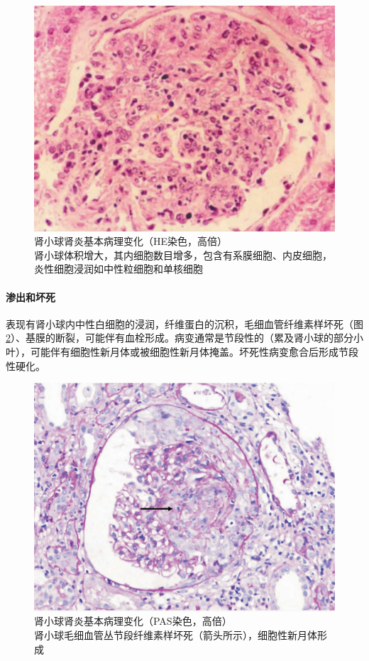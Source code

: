 \begin{figure}[!htbp]
 \centering
 \includegraphics{./images/Image00152.jpg}
 \captionsetup{justification=centering}
 \caption{肾小球肾炎基本病理变化（HE染色，高倍）\\ {\small 肾小球体积增大，其内细胞数目增多，包含有系膜细胞、内皮细胞，炎性细胞浸润如中性粒细胞和单核细胞}}
\label{fig10-6}
  \end{figure}

\paragraph{渗出和坏死}
表现有肾小球内中性白细胞的浸润，纤维蛋白的沉积，毛细血管纤维素样坏死（图\ref{fig10-7}）、基膜的断裂，可能伴有血栓形成。病变通常是节段性的（累及肾小球的部分小叶），可能伴有细胞性新月体或被细胞性新月体掩盖。坏死性病变愈合后形成节段性硬化。

\begin{figure}[!htbp]
 \centering
 \includegraphics{./images/Image00153.jpg}
 \captionsetup{justification=centering}
 \caption{肾小球肾炎基本病理变化（PAS染色，高倍）\\ {\small 肾小球毛细血管丛节段纤维素样坏死（箭头所示），细胞性新月体形成}}
\label{fig10-7}
  \end{figure}


